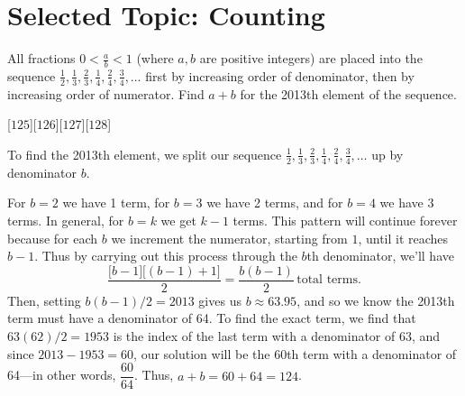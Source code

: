 

\DeclareRobustCommand{\stirling}{\genfrac\{\}{0pt}{}}
\setcounter{secnumdepth}{0} 



\pagestyle{empty}
\sloppy
\maketitle

\section{Selected Topic: Counting}

\begin{problem}
    All fractions \(0 < \frac{a}{b} < 1\) (where \(a, b\) are positive integers) are placed into the sequence 
    \(
    \frac{1}{2}, \frac{1}{3}, \frac{2}{3}, \frac{1}{4}, \frac{2}{4}, \frac{3}{4}, \dots
    \)
    first by increasing order of denominator, then by increasing order of numerator. Find \( a + b \) for the 2013th element of the sequence.
\end{problem}
[$125$][$126$][$127$][$128$]

\begin{solution}[A]
    To find the 2013th element, we split our sequence \( \displaystyle \frac{1}{2}, \frac{1}{3}, \frac{2}{3}, \frac{1}{4}, \frac{2}{4}, \frac{3}{4}, \dots \) up by denominator \(b\).
    
    For \(b=2\) we have 1 term, for \(b=3\) we have 2 terms, and for \(b=4\) we have 3 terms. In general, for \(b=k\) we get \(k-1\) terms. This pattern will continue forever because for each \(b\) we increment the numerator, starting from \(1\), until it reaches \(b-1\). Thus by carrying out this process through the \(b\)th denominator, we'll have
    \[
        \frac{\big[b-1\big]\big[(b-1)+1\big]}{2} = \frac{b(b-1)}{2} \,\text{total terms.}
    \]
    Then, setting \(b(b-1)/2 = 2013\) gives us \(b\approx 63.95\), and so we know the 2013th term must have a denominator of 64. To find the exact term, we find that \( 63(62)/2 = 1953\) is the index of the last term with a denominator of \(63\), and since \(2013-1953=60\), our solution will be the 60th term with a denominator of 64---in other words, \(\dfrac{60}{64}\). Thus, \(a+b=60+64=\boxed{124}\).
\end{solution}

